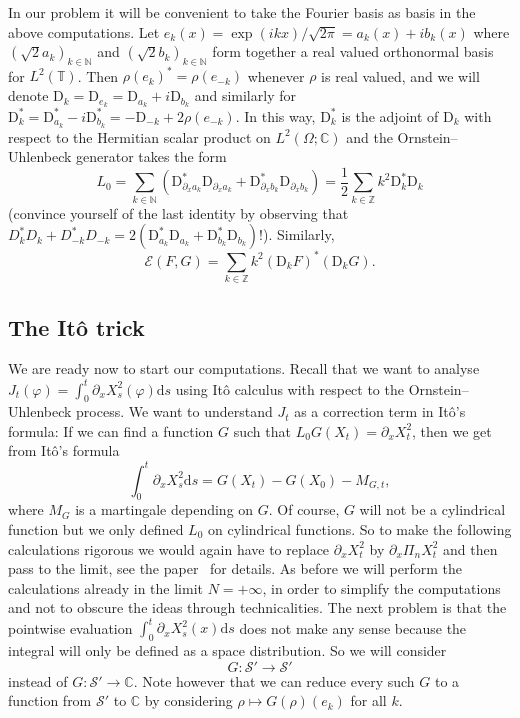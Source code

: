 \documentclass[a4paper,11pt]{article}
\newcommand{\mathD}{\mathrm{D}}
\newcommand{\mathd}{\mathrm{d}}
\newcommand{\CS}{\mathscr{S}}
\begin{document}
\begin{remark}
  In our problem it will be convenient to take the Fourier basis as basis in
  the above computations. Let $e_k (x) = \exp (i k x) / \sqrt{2 \pi} = a_k (x)
  + ib_k (x)$ where $( \sqrt{2} a_k )_{k \in \mathbb{N}}$ and
  $( \sqrt{2} b_k )_{k \in \mathbb{N}}$ form together a real
  valued orthonormal basis for $L^2 (\mathbb{T})$. Then $\rho (e_k)^{\ast} =
  \rho (e_{- k})$ whenever $\rho$ is real valued, and we will denote $\mathD_k
  = \mathD_{e_k} = \mathD_{a_k} + i \mathD_{b_k}$ and similarly for
  $\mathD^{\ast}_k = \mathD_{a_k}^{\ast} - i \mathD_{b_k}^{\ast} = - \mathD_{-
  k} + 2 \rho (e_{- k})$. In this way, $\mathD^{\ast}_k$ is the adjoint of
  $\mathD_k$ with respect to the Hermitian scalar product on $L^2 (\Omega ;
  \mathbb{C})$ and the Ornstein--Uhlenbeck generator takes the form
  \begin{equation}
    L_0 = \sum_{k \in \mathbb{N}} (\mathD_{\partial_x a_k}^{\ast}
    \mathD_{\partial_x a_k} + \mathD_{\partial_x b_k}^{\ast}
    \mathD_{\partial_x b_k}) = \frac{1}{2} \sum_{k \in \mathbb{Z}} k^2
    \mathD_k^{\ast} \mathD_k
  \end{equation}
  (convince yourself of the last identity by observing that $D_{k}^\ast D_k + D_{-k}^\ast D_{-k} = 2(\mathD_{ a_k}^{\ast}  \mathD_{ a_k} + \mathD_{ b_k}^{\ast} \mathD_{b_k})$!). Similarly,
  \begin{equation}
    \mathcal{E} (F, G) = \sum_{k \in \mathbb{Z}} k^2 (\mathD_k F)^{\ast}
    (\mathD_k G) .
  \end{equation}
\end{remark}

\subsection{The It{\^o} trick}

We are ready now to start our computations. Recall that we want to analyse
$J_t (\varphi) = \int_0^t \partial_x X_s^2 (\varphi) \mathd s$ using It{\^o}
calculus with respect to the Ornstein--Uhlenbeck process. We want to
understand $J_t$ as a correction term in It{\^o}'s formula: If we can find
a function $G$ such that $L_0 G (X_t) = \partial_x X_t^2$, then we get from It\^o's formula
\[
   \int_0^t \partial_x X_s^2 \mathd s = G(X_t) - G(X_0) - M_{G,t},
\]
where $M_G$ is a martingale depending on $G$. Of course, $G$ will
not be a cylindrical function but we only defined $L_0$ on cylindrical
functions. So to make the following calculations rigorous we would again have
to replace $\partial_x X_t^2$ by $\partial_x \Pi_n X^2_t$ and then pass to the
limit, see the paper~{\cite{gubinelli_regularization_2013}} for details. As before we will perform the calculations already in the limit $N = + \infty$,
in order to simplify the computations and not to obscure the ideas through
technicalities. The next problem is that the pointwise evaluation $\int_0^t \partial_x X_s^2(x) \mathd s$ does not make any sense because the integral will only be defined as a space distribution. So we will consider
\[
   G \colon \CS' \to \CS'
\]
instead of $G \colon \CS' \to \mathbb{C}$. Note however that we can reduce every such $G$ to a function from $\CS'$ to $\mathbb{C}$ by considering $\rho \mapsto G(\rho)(e_k)$ for all $k$.
\end{document}
